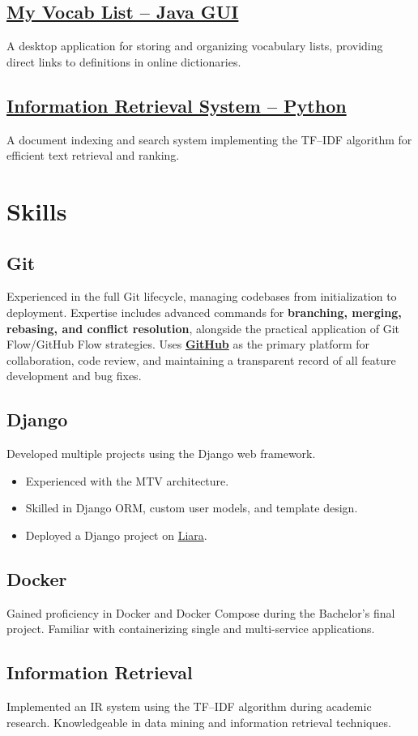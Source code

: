 \documentclass[
10pt, %
]{FreemanCV}
\begin{document}
	\subsection{\href{https://github.com/arashatt/my-vocab-list}{My Vocab List -- Java GUI}}
	A desktop application for storing and organizing vocabulary lists, providing direct links to definitions in online dictionaries.

	\subsection{\href{https://github.com/arashatt/retrieval-system}{Information Retrieval System -- Python}}
	A document indexing and search system implementing the TF--IDF algorithm for efficient text retrieval and ranking.

	\section{Skills}

	\subsection{Git}
	Experienced in the full Git lifecycle, managing codebases from initialization to deployment. Expertise includes advanced commands for \textbf{branching, merging, rebasing, and conflict resolution}, alongside the practical application of Git Flow/GitHub Flow strategies. Uses \href{https://github.com/arashatt}{\textbf{GitHub}} as the primary platform for collaboration, code review, and maintaining a transparent record of all feature development and bug fixes.


	\subsection{Django}
	Developed multiple projects using the Django web framework.
	\begin{itemize}
		\item Experienced with the MTV architecture.
		\item Skilled in Django ORM, custom user models, and template design.
		\item Deployed a Django project on \href{https://liara.ir/}{Liara}.
	\end{itemize}

	\subsection{Docker}
	Gained proficiency in Docker and Docker Compose during the Bachelor's final project. Familiar with containerizing single and multi-service applications.

	\subsection{Information Retrieval}
	Implemented an IR system using the TF--IDF algorithm during academic research. Knowledgeable in data mining and information retrieval techniques.
\end{document}
